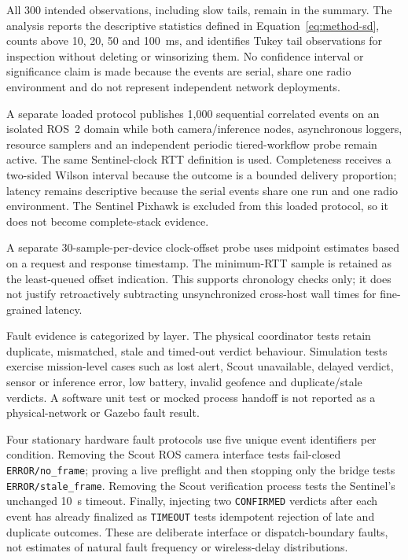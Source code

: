 All 300 intended observations, including slow tails, remain in the summary.
The analysis reports the descriptive statistics defined in
Equation~\ref{eq:method-sd}, counts above 10, 20, 50 and 100~ms, and identifies
Tukey tail observations for inspection without deleting or winsorizing them.
No confidence interval or significance claim is made because the events are
serial, share one radio environment and do not represent independent network
deployments.

A separate loaded protocol publishes 1,000 sequential correlated events on an
isolated ROS~2 domain while both camera/inference nodes, asynchronous loggers,
resource samplers and an independent periodic tiered-workflow probe remain active.
The same Sentinel-clock RTT definition is used. Completeness receives a
two-sided Wilson interval because the outcome is a bounded delivery proportion;
latency remains descriptive because the serial events share one run and one
radio environment. The Sentinel Pixhawk is excluded from this loaded protocol,
so it does not become complete-stack evidence.

A separate 30-sample-per-device clock-offset probe uses midpoint estimates
based on a request and response timestamp. The minimum-RTT sample is retained
as the least-queued offset indication. This supports chronology checks only;
it does not justify retroactively subtracting unsynchronized cross-host wall
times for fine-grained latency.

Fault evidence is categorized by layer. The physical coordinator tests retain
duplicate, mismatched, stale and timed-out verdict behaviour. Simulation tests
exercise mission-level cases such as lost alert, Scout unavailable, delayed
verdict, sensor or inference error, low battery, invalid geofence and
duplicate/stale verdicts. A software unit test or mocked process handoff is not
reported as a physical-network or Gazebo fault result.

Four stationary hardware fault protocols use five unique event identifiers per
condition. Removing the Scout ROS camera interface tests fail-closed
\texttt{ERROR/no\_frame}; proving a live preflight and then stopping only the
bridge tests \texttt{ERROR/stale\_frame}. Removing the Scout verification
process tests the Sentinel's unchanged 10~s timeout. Finally, injecting two
\texttt{CONFIRMED} verdicts after each event has already finalized as
\texttt{TIMEOUT} tests idempotent rejection of late and duplicate outcomes.
These are deliberate interface or dispatch-boundary faults, not estimates of
natural fault frequency or wireless-delay distributions.

